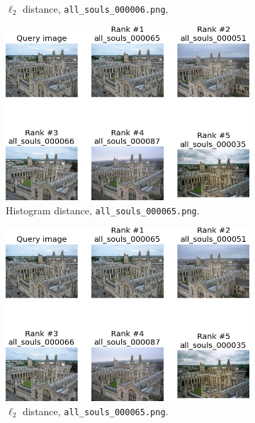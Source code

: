 \documentclass[a4paper,10pt,twoside]{article}
\begin{document}
\begin{figure}
\begin{subfigure}{0.47\textwidth}
    \caption{$\ell_2$ distance, \texttt{all\_souls\_000006.png}.}
  \end{subfigure}
  \begin{subfigure}{0.47\textwidth}
    \centering
    \includegraphics[width=\textwidth]{ranking_h_65}
    \caption{Histogram distance, \texttt{all\_souls\_000065.png}.}
  \end{subfigure}
  \hspace*{\fill}
  \begin{subfigure}{0.47\textwidth}
    \centering
    \includegraphics[width=\textwidth]{ranking_l_65}
    \caption{$\ell_2$ distance, \texttt{all\_souls\_000065.png}.}
  \end{subfigure}
  \begin{subfigure}{0.47\textwidth}
    \centering

\end{subfigure}
\end{figure}
\end{document}
